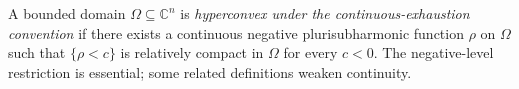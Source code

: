 
A bounded domain $\Omega\subseteq\mathbb C^n$ is \emph{hyperconvex under the continuous-exhaustion convention} if there exists a continuous negative plurisubharmonic function $\rho$ on $\Omega$ such that $\{\rho<c\}$ is relatively compact in $\Omega$ for every $c<0$. The negative-level restriction is essential; some related definitions weaken continuity.
